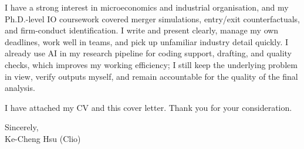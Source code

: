 \documentclass[11pt,letterpaper]{article}
\begin{document}
I have a strong interest in microeconomics and industrial organisation, and my Ph.D.-level IO coursework covered merger simulations, entry/exit counterfactuals, and firm-conduct identification. I write and present clearly, manage my own deadlines, work well in teams, and pick up unfamiliar industry detail quickly. I already use AI in my research pipeline for coding support, drafting, and quality checks, which improves my working efficiency; I still keep the underlying problem in view, verify outputs myself, and remain accountable for the quality of the final analysis.

I have attached my CV and this cover letter. Thank you for your consideration.

\vspace{0.7em}
Sincerely,\\[1.0em]
Ke-Cheng Hsu (Clio)
\end{document}
